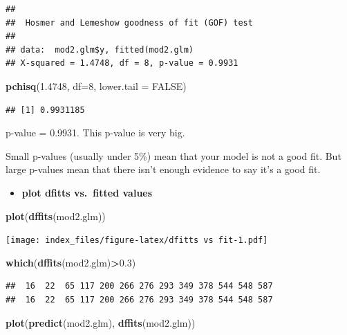 \documentclass[
]{article}
\newenvironment{Shaded}{\begin{snugshade}}{\end{snugshade}}
\newcommand{\DataTypeTok}[1]{\textcolor[rgb]{0.13,0.29,0.53}{#1}}
\newcommand{\DecValTok}[1]{\textcolor[rgb]{0.00,0.00,0.81}{#1}}
\newcommand{\FloatTok}[1]{\textcolor[rgb]{0.00,0.00,0.81}{#1}}
\newcommand{\KeywordTok}[1]{\textcolor[rgb]{0.13,0.29,0.53}{\textbf{#1}}}
\newcommand{\NormalTok}[1]{#1}
\newcommand{\OperatorTok}[1]{\textcolor[rgb]{0.81,0.36,0.00}{\textbf{#1}}}
\newcommand{\OtherTok}[1]{\textcolor[rgb]{0.56,0.35,0.01}{#1}}
\providecommand{\tightlist}{%
  \setlength{\itemsep}{0pt}\setlength{\parskip}{0pt}}
\begin{document}
\begin{verbatim}
## 
##  Hosmer and Lemeshow goodness of fit (GOF) test
## 
## data:  mod2.glm$y, fitted(mod2.glm)
## X-squared = 1.4748, df = 8, p-value = 0.9931
\end{verbatim}

\begin{Shaded}
\begin{Highlighting}[]
\KeywordTok{pchisq}\NormalTok{(}\FloatTok{1.4748}\NormalTok{, }\DataTypeTok{df=}\DecValTok{8}\NormalTok{, }\DataTypeTok{lower.tail =} \OtherTok{FALSE}\NormalTok{)}
\end{Highlighting}
\end{Shaded}

\begin{verbatim}
## [1] 0.9931185
\end{verbatim}

p-value = 0.9931. This p-value is very big.

Small p-values (usually under 5\%) mean that your model is not a good
fit. But large p-values mean that there isn't enough evidence to say
it's a good fit.

\begin{itemize}
\tightlist
\item
  \textbf{plot dfitts vs.~fitted values}
\end{itemize}

\begin{Shaded}
\begin{Highlighting}[]
\KeywordTok{plot}\NormalTok{(}\KeywordTok{dffits}\NormalTok{(mod2.glm))}
\end{Highlighting}
\end{Shaded}

\texttt{[image: index\_files/figure-latex/dfitts vs fit-1.pdf]}

\begin{Shaded}
\begin{Highlighting}[]
\KeywordTok{which}\NormalTok{(}\KeywordTok{dffits}\NormalTok{(mod2.glm)}\OperatorTok{>}\FloatTok{0.3}\NormalTok{)}
\end{Highlighting}
\end{Shaded}

\begin{verbatim}
##  16  22  65 117 200 266 276 293 349 378 544 548 587 
##  16  22  65 117 200 266 276 293 349 378 544 548 587
\end{verbatim}

\begin{Shaded}
\begin{Highlighting}[]
\KeywordTok{plot}\NormalTok{(}\KeywordTok{predict}\NormalTok{(mod2.glm), }\KeywordTok{dffits}\NormalTok{(mod2.glm))}
\end{Highlighting}
\end{Shaded}
\end{document}
